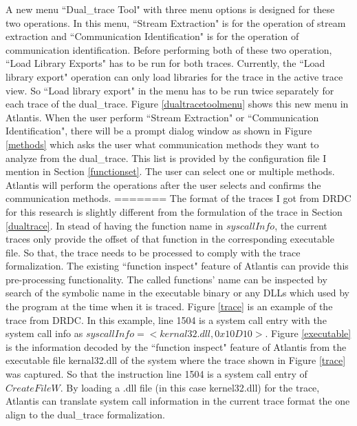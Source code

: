 A new menu ``Dual\_trace Tool" with three menu options is designed for these two operations. In this menu, ``Stream Extraction" is for the operation of stream extraction and ``Communication Identification" is for the operation of communication identification. Before performing both of these two operation, ``Load Library Exports" has to be run for both traces. Currently, the ``Load library export"  operation can only load libraries for the trace in the active trace view. So ``Load library export"  in the menu has to be run twice separately for each trace of the dual\_trace.  Figure \ref{dualtracetoolmenu} shows this new menu in Atlantis. When the user perform ``Stream Extraction" or ``Communication Identification", there will be a prompt dialog window as shown in Figure \ref{methods} which asks the user what communication methods they want to analyze from the dual\_trace. This list is provided by the configuration file I mention in Section \ref{functionset}. The user can select one or multiple methods. Atlantis will perform the operations after the user selects and confirms the communication methods.
=======
The format of the traces I got from DRDC for this research is slightly different from the formulation of the trace in Section \ref{dualtrace}. In stead of having the function name in $syscallInfo$, the current traces only provide the offset of that function in the corresponding executable file. So that, the trace needs to be processed to comply with the trace formalization.
The existing ``function inspect" feature of Atlantis can provide this pre-processing functionality. The called functions' name can be inspected  by  search of the symbolic name in the executable binary or any DLLs which used by the program at the time when it is traced. Figure \ref{trace} is an example of the trace from DRDC. In this example, line 1504 is a system call entry with the system call info as $syscallInfo = <kernal32.dll, 0x10D10>$. 
Figure \ref{executable} is the information decoded by the ``function inspect" feature of Atlantis from the executable file kernal32.dll of the system where the trace shown in Figure \ref{trace} was captured. So that the instruction line 1504 is a system call entry of $CreateFileW$. By loading a .dll file (in this case kernel32.dll) for the trace, Atlantis can translate system call information in the current trace format the one align to the dual\_trace formalization.

